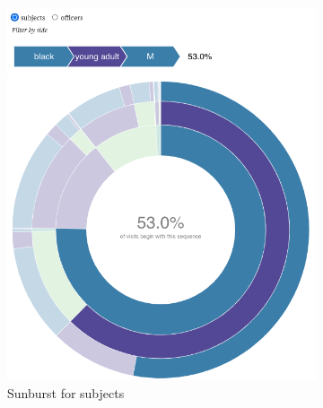 \documentclass[10pt]{article}
\begin{document}
\begin{figure}
\captionsetup{font=small}
    \begin{subfigure}{0.5\textwidth}
        \includegraphics[width=\textwidth]{sunburst-subject}
        \caption{Sunburst for subjects}
        \label{sunburst-subject}
    \end{subfigure}%
    \begin{subfigure}{0.5\textwidth}

\end{subfigure}
\end{figure}
\end{document}
